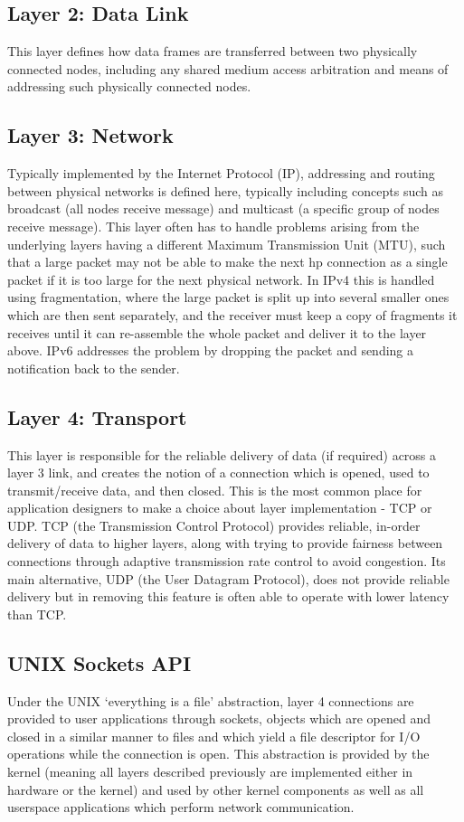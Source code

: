 \documentclass[a4paper,12pt,twoside,openright]{report}
\begin{document}
	\subsection{Layer 2: Data Link}
	This layer defines how data frames are transferred between two physically connected nodes, including any shared medium access arbitration and means of addressing such physically connected nodes.
	
	\subsection{Layer 3: Network}
	Typically implemented by the Internet Protocol (IP), addressing and routing between physical networks is defined here, typically including concepts such as broadcast (all nodes receive message) and multicast (a specific group of nodes receive message). This layer often has to handle problems arising from the underlying layers having a different Maximum Transmission Unit (MTU), such that a large packet may not be able to make the next hp connection as a single packet if it is too large for the next physical network. In IPv4 this is handled using fragmentation, where the large packet is split up into several smaller ones which are then sent separately, and the receiver must keep a copy of fragments it receives until it can re-assemble the whole packet and deliver it to the layer above. IPv6 addresses the problem by dropping the packet and sending a notification back to the sender.
	
	\subsection{Layer 4: Transport}
	This layer is responsible for the reliable delivery of data (if required) across a layer 3 link, and creates the notion of a connection which is opened, used to transmit/receive data, and then closed. This is the most common place for application designers to make a choice about layer implementation - TCP or UDP. TCP (the Transmission Control Protocol) provides reliable, in-order delivery of data to higher layers, along with trying to provide fairness between connections through adaptive transmission rate control to avoid congestion. Its main alternative, UDP (the User Datagram Protocol), does not provide reliable delivery but in removing this feature is often able to operate with lower latency than TCP.
	
	\subsection{UNIX Sockets API}
	Under the UNIX `everything is a file' abstraction, layer 4 connections are provided to user applications through sockets, objects which are opened and closed in a similar manner to files and which yield a file descriptor for I/O operations while the connection is open. This abstraction is provided by the kernel (meaning all layers described previously are implemented either in hardware or the kernel) and used by other kernel components as well as all userspace applications which perform network communication.
	
\end{document}
